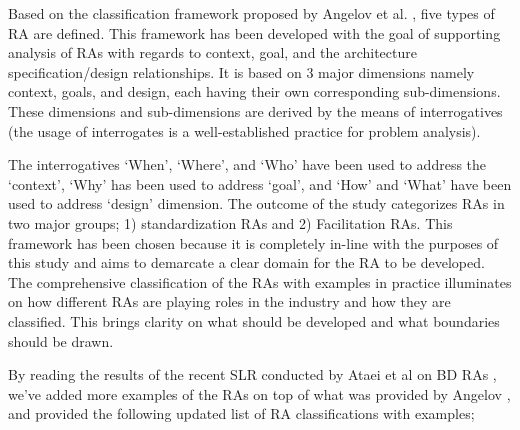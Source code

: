\documentclass[review]{elsarticle}
\begin{document}
Based on the classification framework proposed by Angelov et al. \cite{angelov2009classification}, five types of RA are defined. This framework has been developed with the goal of supporting analysis of RAs with regards to context, goal, and the architecture specification/design relationships. It is based on 3 major dimensions namely context, goals, and design, each having their own corresponding sub-dimensions. These dimensions and sub-dimensions are derived by the means of interrogatives (the usage of interrogates is a well-established practice for problem analysis).

The interrogatives ‘When’, ‘Where’, and ‘Who’ have been used to address the ‘context’, ‘Why’ has been used to address ‘goal’, and ‘How’ and ‘What’ have been used to address ‘design’ dimension. The outcome of the study categorizes RAs in two major groups; 1) standardization RAs and 2) Facilitation RAs. This framework has been chosen because it is completely in-line with the purposes of this study and aims to demarcate a clear domain for the RA to be developed. The comprehensive classification of the RAs with examples in practice illuminates on how different RAs are playing roles in the industry and how they are classified. This brings clarity on what should be developed and what boundaries should be drawn.

By reading the results of the recent SLR conducted by Ataei et al on BD RAs \cite{AtaeiACIS}, we've added more examples of the RAs on top of what was provided by Angelov \cite{angelov2009classification}, and provided the following updated list of RA classifications with examples;
\end{document}
